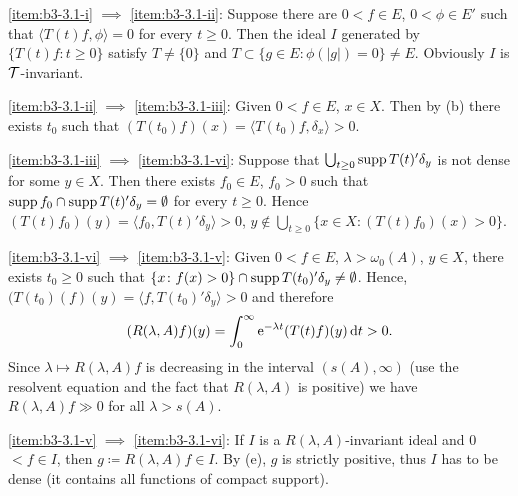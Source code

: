 \ref{item:b3-3.1-i} $\implies$ \ref{item:b3-3.1-ii}: Suppose there are $0 < f \in E$, $0 < \phi \in E'$ such that $\langle T(t)f,\phi \rangle = 0$ for every $t \geq 0$.
Then the ideal $I$ generated by $\{T(t)f \colon t \geq 0\}$ satisfy $T \neq \{0\}$  and  $T \subset \{g \in E \colon \phi(|g|) = 0\} \neq E$.
Obviously $I$ is $\mathcal{T}$-invariant.

\ref{item:b3-3.1-ii} $\implies$ \ref{item:b3-3.1-iii}: Given $0 < f \in E$, $x \in X$.
Then by (b) there exists $t_{0}$ such that $(T(t_{0})f)(x) = \langle T(t_{0})f,\delta_{x} \rangle > 0$.

\ref{item:b3-3.1-iii} $\implies$ \ref{item:b3-3.1-vi}: Suppose that $\bigcup_{t \geq 0}\mathop{}\!\mathrm{supp}\, T(t)'\delta_{y}$ is not dense for some $y \in X$.
Then there exists $f_{0} \in E$, $f_{0} > 0$ such that
$\mathop{}\!\mathrm{supp}\, f_{0} \cap \mathop{}\!\mathrm{supp}\, T(t)'\delta_{y} = \emptyset$ for every $t \geq 0$.
Hence $(T(t)f_{0})(y) = \langle f_{0},T(t)'\delta_{y} \rangle > 0$, \ie $y \notin \bigcup_{t\geq 0}\{x \in X \colon (T(t)f_{0})(x) > 0\}$.

\ref{item:b3-3.1-vi} $\implies$ \ref{item:b3-3.1-v}: Given $0 < f \in E$, $\lambda > \omega_{0}(A)$, $y \in X$, there exists $t_{0} \geq 0$ such that 
$\{x \colon f(x) > 0\} \cap \mathop{}\!\mathrm{supp}\, T(t_{0})'\delta_{y} \neq \emptyset$.
Hence, $(T(t_{0})(f)(y) = \langle f,T(t_{0})'\delta_{y} \rangle > 0$ and therefore
\[
(R(\lambda,A)f)(y) = \int_{0}^{\infty} \mathrm{e}^{-\lambda t}(T(t)f)(y) \mathop{}\!\mathrm{d}{t} > 0 .
\]
Since $\lambda \mapsto R(\lambda,A)f$ is decreasing in the interval $(s(A),\infty)$ (use the resolvent equation and the fact that $R(\lambda,A)$ is positive) we have $R(\lambda,A)f \gg 0$ for all $\lambda > s(A)$.

\ref{item:b3-3.1-v} $\implies$ \ref{item:b3-3.1-vi}: If $I$ is a $R(\lambda,A)$-invariant ideal and 0$ < f \in I$, then $g \coloneqq R(\lambda,A)f \in I$. 
By (e), $g$ is strictly positive, thus $I$ has to be dense (it contains all functions of compact support). 

